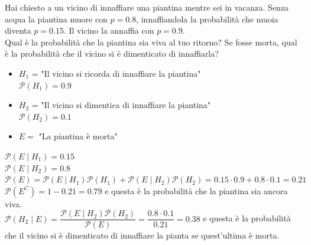 \documentclass[12pt]{report}
\newcounter{exercise}
\begin{document}
	\begin{exercise}{}{}
		\begin{assignment}{}{}
			Hai chiesto a un vicino di innaffiare una piantina mentre sei in vacanza. Senza acqua la piantina muore con $p = 0.8$, innaffiandola la probabilità che muoia diventa $p = 0.15$. Il vicino la annaffia con $p = 0.9$. \\
			Qual è la probabilità che la piantina sia viva al tuo ritorno? Se fosse morta, qual è la probabilità che il vicino si è dimenticato di innaffiarla?
		\end{assignment}
		\begin{itemize}
			\item $H_1$ = "Il vicino si ricorda di innaffiare la piantina" \\
			$\mathcal{P}(H_1) = 0.9$
			\item $H_2$ =  "Il vicino si dimentica di innaffiare la piantina" \\
			$\mathcal{P}(H_2) = 0.1$
			\item $E = $ "La piantina è morta"
		\end{itemize}
		$\mathcal{P}(E \mid H_1) = 0.15$ \\
		$\mathcal{P}(E \mid H_2) = 0.8$ \\
		$\mathcal{P}(E) = \mathcal{P}(E \mid H_1)\mathcal{P}(H_1) + \mathcal{P}(E \mid H_2)\mathcal{P}(H_2) = 0.15 \cdot 0.9 + 0.8 \cdot 0.1 = 0.21$ \\
		$\mathcal{P}(E^C) = 1 - 0.21 = 0.79$ e questa è la probabilità che la piantina sia ancora viva. \\
		$\mathcal{P}(H_2 \mid E) = \dfrac{\mathcal{P}(E \mid H_2)\mathcal{P}(H_2)}{\mathcal{P}(E)} = \dfrac{0.8 \cdot 0.1}{0.21} = 0.38$ e questa è la probabilità che il vicino si è dimenticato di innaffiare la pianta se quest'ultima è morta.
	\end{exercise}
\end{document}
